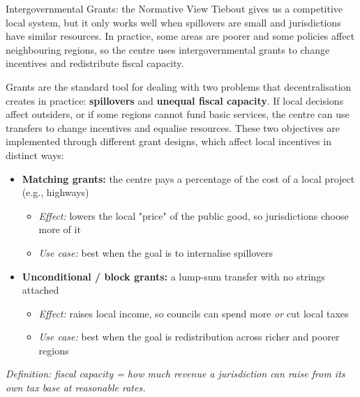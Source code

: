 \documentclass[10pt]{beamer}
\begin{document}
\begin{frame}[allowframebreaks]{Intergovernmental Grants: the Normative View}
Tiebout gives us a competitive local system, but it only works well when spillovers are small and jurisdictions have similar resources. In practice, some areas are poorer and some policies affect neighbouring regions, so the centre uses intergovernmental grants to change incentives and redistribute fiscal capacity.

Grants are the standard tool for dealing with two problems that decentralisation creates in practice: \textbf{spillovers} and \textbf{unequal fiscal capacity}.
If local decisions affect outsiders, or if some regions cannot fund basic services, the centre can use transfers to change incentives and equalise resources. These two objectives are implemented through different grant designs, which affect local incentives in distinct ways:

\begin{itemize}
\item \textbf{Matching grants:} the centre pays a percentage of the cost of a local project (e.g., highways)
\begin{itemize}
\item \textit{Effect:} lowers the local "price" of the public good, so jurisdictions choose more of it
\item \textit{Use case:} best when the goal is to internalise spillovers
\end{itemize}
\item \textbf{Unconditional / block grants:} a lump-sum transfer with no strings attached
\begin{itemize}
\item \textit{Effect:} raises local income, so councils can spend more \textit{or} cut local taxes
\item \textit{Use case:} best when the goal is redistribution across richer and poorer regions
\end{itemize}
\end{itemize}

\vspace{0.1cm}
\footnotesize
\textit{Definition: fiscal capacity = how much revenue a jurisdiction can raise from its own tax base at reasonable rates.}
\end{frame}
\end{document}
